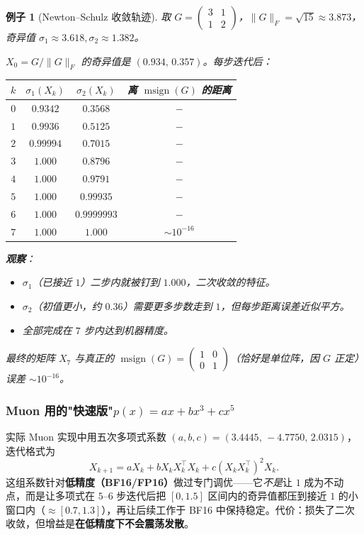 \documentclass[11pt,a4paper]{article}
\theoremstyle{mythm}
\theoremstyle{mydef}
\newtheorem{example}[theorem]{例子}
\newcommand{\msign}{\operatorname{msign}}
\begin{document}
\begin{example}[Newton--Schulz 收敛轨迹]\label{ex:ns-trace}
取 $G = \begin{pmatrix}3 & 1\\ 1 & 2\end{pmatrix}$，$\|G\|_F = \sqrt{15} \approx 3.873$，奇异值 $\sigma_1\approx 3.618, \sigma_2\approx 1.382$。

$X_0 = G/\|G\|_F$ 的奇异值是 $(0.934,\, 0.357)$。每步迭代后：
\begin{center}
\begin{tabular}{c|cc|c}
\hline
$k$ & $\sigma_1(X_k)$ & $\sigma_2(X_k)$ & 离 $\msign(G)$ 的距离 \\\hline
$0$ & $0.9342$ & $0.3568$ & $-$ \\
$1$ & $0.9936$ & $0.5125$ & $-$ \\
$2$ & $0.99994$ & $0.7015$ & $-$ \\
$3$ & $1.000$ & $0.8796$ & $-$ \\
$4$ & $1.000$ & $0.9791$ & $-$ \\
$5$ & $1.000$ & $0.99935$ & $-$ \\
$6$ & $1.000$ & $0.9999993$ & $-$ \\
$7$ & $1.000$ & $1.000$ & $\sim 10^{-16}$ \\\hline
\end{tabular}
\end{center}

\textbf{观察}：
\begin{itemize}[leftmargin=2em]
\item $\sigma_1$（已接近 $1$）二步内就被钉到 $1.000$，\emph{二次收敛}的特征。
\item $\sigma_2$（初值更小，约 $0.36$）需要更多步数走到 $1$，但每步距离误差近似平方。
\item 全部完成在 $7$ 步内达到机器精度。
\end{itemize}

最终的矩阵 $X_7$ 与真正的 $\msign(G) = \begin{pmatrix}1 & 0\\ 0 & 1\end{pmatrix}$（恰好是单位阵，因 $G$ 正定）误差 $\sim 10^{-16}$。
\end{example}

\subsubsection*{Muon 用的"快速版"$p(x) = ax + bx^3 + cx^5$}

实际 Muon 实现中用五次多项式系数 $(a,b,c) = (3.4445,\,-4.7750,\,2.0315)$，迭代格式为
\begin{equation}\label{eq:ns-muon}
X_{k+1} = a X_k + b X_k X_k^\top X_k + c (X_k X_k^\top)^2 X_k.
\end{equation}
这组系数针对\textbf{低精度（BF16/FP16）}做过专门调优——它\emph{不是}让 $1$ 成为不动点，而是让多项式在 $5$--$6$ 步迭代后把 $[0, 1.5]$ 区间内的奇异值都压到接近 $1$ 的小窗口内（$\approx [0.7, 1.3]$），再让后续工作于 BF16 中保持稳定。代价：损失了二次收敛，但增益是\textbf{在低精度下不会震荡发散}。
\end{document}
